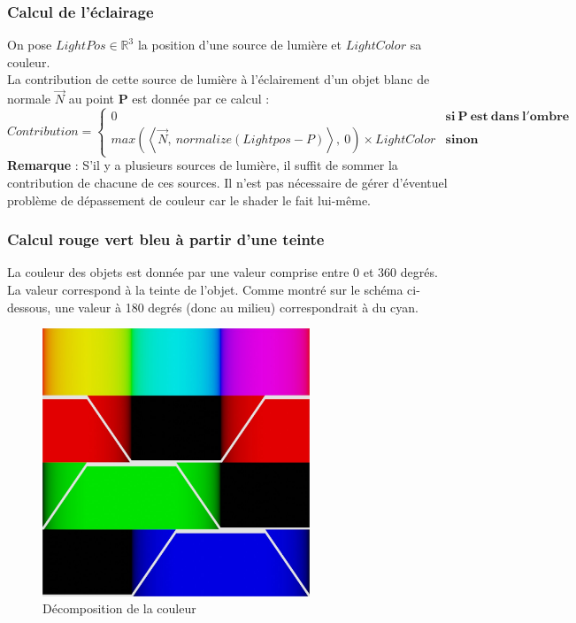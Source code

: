 \subsubsection{Calcul de l'éclairage}
On pose $LightPos \in \mathbb{R}^3$ la position d'une source de lumière et $LightColor$ sa couleur.
\\La contribution de cette source de lumière à l'éclairement d'un objet blanc de normale $\Vec{N}$ au point $\mathbf{P}$ est donnée par ce calcul :
$$
    Contribution=\left\{
        \begin{array}{ll}
            0 & \mathbf{si\ P\ est\ dans\ l'ombre} \\
            max(\left\langle \Vec{N},\ normalize(Lightpos-P) \right\rangle,\ 0) \times LightColor & \mathbf{sinon}
        \end{array}
    \right.
$$
\textbf{Remarque} : S'il y a plusieurs sources de lumière, il suffit de sommer la contribution de chacune de ces sources. Il n'est pas nécessaire de gérer d'éventuel problème de dépassement de couleur car le shader le fait lui-même.

\newpage
\subsubsection{Calcul rouge vert bleu à partir d'une teinte}

La couleur des objets est donnée par une valeur comprise entre 0 et 360 degrés. La valeur correspond à la teinte de l'objet. Comme montré sur le schéma ci-dessous, une valeur à 180 degrés (donc au milieu) correspondrait à du cyan.

\begin{figure}[h]
    \centering
    \includegraphics[width=8cm]{images/huetorgb.jpg}
    \caption{Décomposition de la couleur }\label{fig:huetorgb}
\end{figure}


